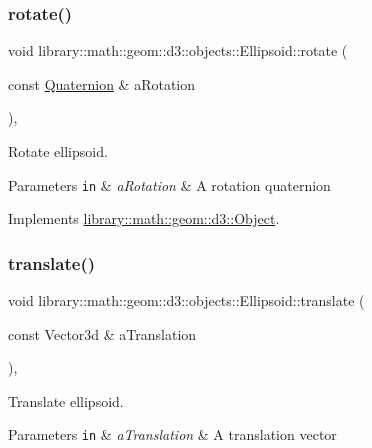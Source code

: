 \subsubsection{\texorpdfstring{rotate()}{rotate()}}
{\footnotesize\ttfamily void library\+::math\+::geom\+::d3\+::objects\+::\+Ellipsoid\+::rotate (\begin{DoxyParamCaption}\item[{const \hyperlink{classlibrary_1_1math_1_1geom_1_1trf_1_1rot_1_1_quaternion}{Quaternion} \&}]{a\+Rotation }\end{DoxyParamCaption})\hspace{0.3cm}{\ttfamily [override]}, {\ttfamily [virtual]}}



Rotate ellipsoid. 


\begin{DoxyParams}[1]{Parameters}
\mbox{\tt in}  & {\em a\+Rotation} & A rotation quaternion \\
\hline
\end{DoxyParams}


Implements \hyperlink{classlibrary_1_1math_1_1geom_1_1d3_1_1_object_aabefebc4960530ce6356c4445c5d490e}{library\+::math\+::geom\+::d3\+::\+Object}.

\mbox{\label{classlibrary_1_1math_1_1geom_1_1d3_1_1objects_1_1_ellipsoid_a7ef605ac9ab20b5bd47ade8603ee6e09}} 
\subsubsection{\texorpdfstring{translate()}{translate()}}
{\footnotesize\ttfamily void library\+::math\+::geom\+::d3\+::objects\+::\+Ellipsoid\+::translate (\begin{DoxyParamCaption}\item[{const Vector3d \&}]{a\+Translation }\end{DoxyParamCaption})\hspace{0.3cm}{\ttfamily [override]}, {\ttfamily [virtual]}}



Translate ellipsoid. 


\begin{DoxyParams}[1]{Parameters}
\mbox{\tt in}  & {\em a\+Translation} & A translation vector \\
\hline
\end{DoxyParams}


